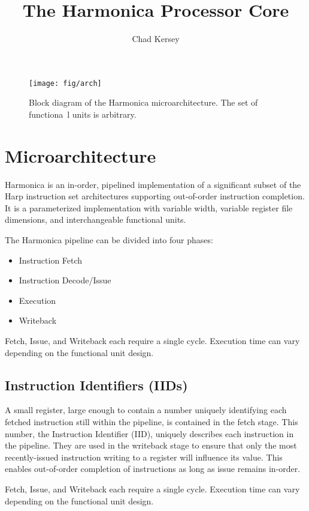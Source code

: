 \documentclass[10pt,twocolumn]{article}
\title{The Harmonica Processor Core}
\author{Chad Kersey}
\begin{document}
\maketitle

\begin{figure*}
\begin{center}
\texttt{[image: fig/arch]}
\caption{Block diagram of the Harmonica microarchitecture. The set of functiona\
l units is arbitrary.}
\label{fig:arch}
\end{center}
\end{figure*}


\section{Microarchitecture}
Harmonica is an in-order, pipelined implementation of a significant subset of the Harp instruction set architectures supporting out-of-order instruction completion.
It is a parameterized implementation with variable width, variable register file dimensions, and interchangeable functional units.

The Harmonica pipeline can be divided into four phases:
\begin{itemize}
  \item Instruction Fetch
  \item Instruction Decode/Issue
  \item Execution
  \item Writeback
\end{itemize}

Fetch, Issue, and Writeback each require a single cycle.
Execution time can vary depending on the functional unit design.

\subsection{Instruction Identifiers (IIDs)}
A small register, large enough to contain a number uniquely identifying each fetched instruction still within the pipeline, is contained in the fetch stage.
This number, the Instruction Identifier (IID), uniquely describes each instruction in the pipeline.
They are used in the writeback stage to ensure that only the most recently-issued instruction writing to a register will influence its value.
This enables out-of-order completion of instructions as long as issue remains in-order.

Fetch, Issue, and Writeback each require a single cycle.
Execution time can vary depending on the functional unit design.
\end{document}
